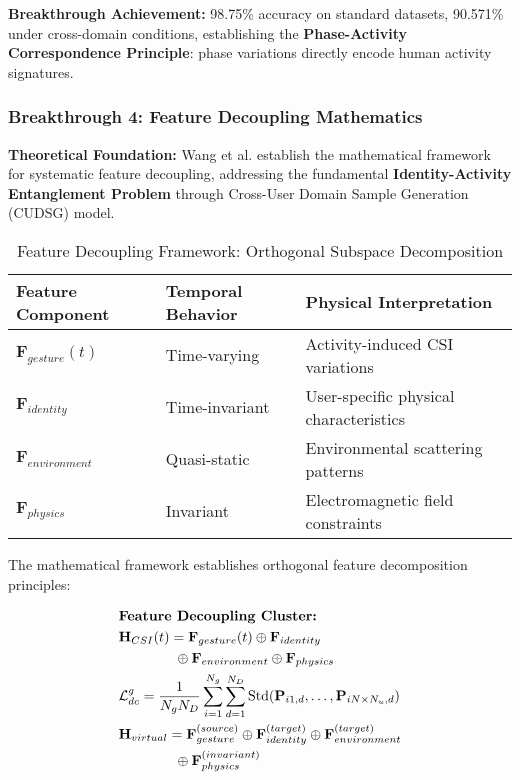 \documentclass[journal]{IEEEtran}
\begin{document}
\textbf{Breakthrough Achievement:} 98.75\% accuracy on standard datasets, 90.571\% under cross-domain conditions, establishing the \textbf{Phase-Activity Correspondence Principle}: phase variations directly encode human activity signatures.

\subsubsection{Breakthrough 4: Feature Decoupling Mathematics}

\textbf{Theoretical Foundation:} Wang et al. \cite{wang2024feature} establish the mathematical framework for systematic feature decoupling, addressing the fundamental \textbf{Identity-Activity Entanglement Problem} through Cross-User Domain Sample Generation (CUDSG) model.

\begin{table}[h]
\centering
\caption{Feature Decoupling Framework: Orthogonal Subspace Decomposition}
\label{tab:feature_decoupling}
\begin{tabular}{|p{1.5cm}|p{3.2cm}|p{1.8cm}|}
\hline
\textbf{Feature Component} & \textbf{Temporal Behavior} & \textbf{Physical Interpretation} \\
\hline
$\mathbf{F}_{gesture}(t)$ & Time-varying & Activity-induced CSI variations \\
$\mathbf{F}_{identity}$ & Time-invariant & User-specific physical characteristics \\
$\mathbf{F}_{environment}$ & Quasi-static & Environmental scattering patterns \\
$\mathbf{F}_{physics}$ & Invariant & Electromagnetic field constraints \\
\hline
\end{tabular}
\end{table}

The mathematical framework establishes orthogonal feature decomposition principles:

\begin{align}
&\hspace{2em} \text{\textbf{Feature Decoupling Cluster:}} \quad &  \nonumber \\
&\hspace{2em} \mathbf{H}_{CSI}(t) = \mathbf{F}_{gesture}(t) \oplus \mathbf{F}_{identity}  \quad &  \nonumber \\ 
&\hspace{6em} \oplus \mathbf{F}_{environment} \oplus \mathbf{F}_{physics} \label{eq:feature_decomposition_v4} \\
&\hspace{2em} \mathcal{L}_{dc}^g = \frac{1}{N_g N_D} \sum_{i=1}^{N_g} \sum_{d=1}^{N_D} \text{Std}(\mathbf{P}_{i1,d}, \ldots, \mathbf{P}_{iN \times N_u,d}) \label{eq:gesture_decoupling_v4} \\
&\hspace{2em} \mathbf{H}_{virtual} = \mathbf{F}_{gesture}^{(source)} \oplus \mathbf{F}_{identity}^{(target)} \oplus \mathbf{F}_{environment}^{(target)} \quad &  \nonumber \\
&\hspace{6em} \oplus \mathbf{F}_{physics}^{(invariant)} \label{eq:virtual_generation_v4}
\end{align}
\end{document}
